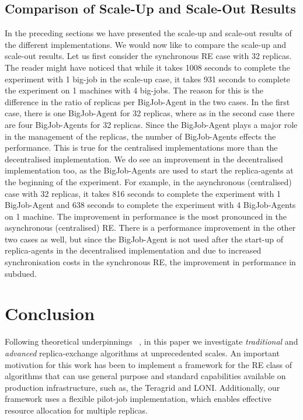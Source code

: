 \documentclass{rspublic}
\newcommand{\alnote}[1]{ {\textcolor{blue} { ***andre: #1 }}}
\newcommand{\alnote}[1]{}
\begin{document}
\subsection{Comparison of Scale-Up and Scale-Out Results}
In the preceding sections we have presented the scale-up and scale-out results of the different implementations. We would now like to compare the scale-up and scale-out results. Let us first consider the synchronous RE case with 32 replicas. The reader might have noticed that while it takes 1008 seconds to complete the experiment with 1 big-job in the scale-up case, it takes 931 seconds to complete the experiment on 1 machines with 4 big-jobs. The reason for this is the difference in the ratio of replicas per BigJob-Agent in the two cases. In the first case, there is one BigJob-Agent for 32 replicas, where as in the second case there are four BigJob-Agents for 32 replicas. Since the BigJob-Agent plays a major role in the management of the replicas, the number of BigJob-Agents effects the performance. This is true for  the centralised implementations more than the decentralised implementation. We do see an improvement in the decentralised implementation too, as the BigJob-Agents are used to start the replica-agents at the beginning of the experiment. For example, in the asynchronous (centralised) case with 32 replicas, it takes 816 seconds to complete the experiment with 1 BigJob-Agent and 638 seconds to complete the experiment with 4 BigJob-Agents on 1 machine. 
The improvement in performance is the most pronounced in the asynchronous (centralised) RE. There is a performance improvement in the other two cases as well, but since the BigJob-Agent is not used after the start-up of replica-agents in the decentralised implementation and  due to increased synchronisation costs in the synchronous RE, the improvement in performance in subdued. 

\section{Conclusion}
\label{sec:conclusion}

Following theoretical underpinnings
~\citep{parashar_arepex,DBLP:journals/jcc/GallicchioLP08}, in this
paper we investigate {\it traditional} and {\it advanced}
replica-exchange algorithms at unprecedented scales.  An important
motivation for this work has been to implement a framework for the RE
class of algorithms that can use general purpose and standard
capabilities available on production infrastructure, such as, the
Teragrid and LONI.  Additionally, our framework uses a flexible
pilot-job implementation, which enables effective resource allocation
for multiple replicas.
\end{document}
